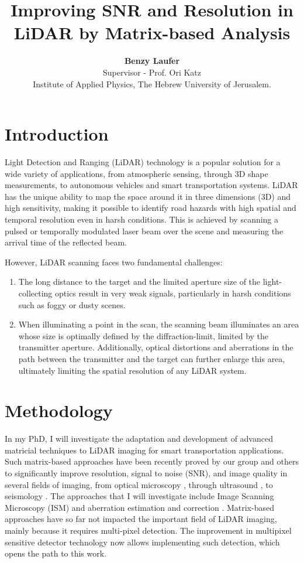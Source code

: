 \documentclass{article}
\title{\textbf{\Large Improving SNR and Resolution in LiDAR by Matrix-based Analysis}}
\author{
    \textbf{Benzy Laufer} \\  Supervisor - Prof. Ori Katz \\
    Institute of Applied Physics, The Hebrew University of Jerusalem. 
}
\begin{document}
\date{}

\maketitle

\vspace{-0.5em}
\section{Introduction}
\large Light Detection and Ranging (LiDAR) technology is a popular solution for a wide variety of applications, from atmospheric sensing, through 3D shape measurements, to autonomous vehicles and smart transportation systems. LiDAR has the unique ability to map the space around it in three dimensions (3D) and high sensitivity, making it possible to identify road hazards with high spatial and temporal resolution even in harsh conditions. This is achieved by scanning a pulsed or temporally modulated laser beam over the scene and measuring the arrival time of the reflected beam.

However, LiDAR scanning faces two fundamental challenges:
\begin{enumerate}
    \item The long distance to the target and the limited aperture size of the light-collecting optics result in very weak signals, particularly in harsh conditions such as foggy or dusty scenes.
    \item When illuminating a point in the scan, the scanning beam illuminates an area whose size is optimally defined by the diffraction-limit, limited by the transmitter aperture. Additionally, optical distortions and aberrations in the path between the transmitter and the target can further enlarge this area, ultimately limiting the spatial resolution of any LiDAR system.
\end{enumerate}

\vspace{-0.5em}
\section{Methodology}
In my PhD, I will investigate the adaptation and development of advanced matricial techniques to LiDAR imaging for smart transportation applications. Such matrix-based approaches have been recently proved by our group and others to significantly improve resolution, signal to noise (SNR), and image quality in several fields of imaging, from optical microscopy \cite{Badon2020}, through ultrasound \cite{PhysRevX.10.021048}, to seismology \cite{2018JB016361}. The approaches that I will investigate include Image Scanning Microscopy (ISM) \cite{muller} and aberration estimation and correction \cite{Badon2020}. Matrix-based approaches have so far not impacted the important field of LiDAR imaging, mainly because it requires multi-pixel detection. The improvement in multipixel sensitive detector technology now allows implementing such detection, which opens the path to this work.
\end{document}
